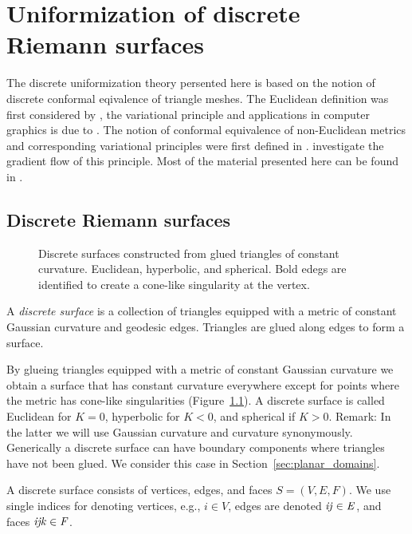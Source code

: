 \chapter{Uniformization of discrete Riemann surfaces}

The discrete uniformization theory persented here is based on the notion of discrete conformal eqivalence of triangle meshes. The Euclidean definition was first considered by \cite{Luo2004}, the variational principle and applications in computer graphics is due to \cite{Springborn2008, OWF2009, Bobenko2010}. The notion of conformal equivalence of non-Euclidean metrics and corresponding variational principles were first defined in \cite{Bobenko2010}. \cite{Guo2011} investigate the gradient flow of this principle.
Most of the material presented here can be found in \cite{BobSechSpr}.

\section{Discrete Riemann surfaces}

\begin{figure}
\centering
\scalebox{0.8}{}
\caption[Discrete surfaces from glued triangles]{Discrete surfaces constructed from glued triangles of constant curvature. Euclidean, hyperbolic, and spherical. Bold edegs are identified to create a cone-like singularity at the vertex.}
\label{fig:surface_triangles}
\end{figure}

\begin{definition}
A \emph{discrete surface} is a collection of triangles equipped with a metric of constant Gaussian curvature and geodesic edges. Triangles are glued along edges to form a surface.
\end{definition}

By glueing triangles equipped with a metric of constant Gaussian curvature we obtain a surface that has constant curvature everywhere except for points where the metric has cone-like singularities (Figure~\ref{fig:surface_triangles}). A discrete surface is called Euclidean for $K=0$, hyperbolic for $K<0$, and spherical if $K>0$.
Remark: In the latter we will use Gaussian curvature and curvature synonymously.
Generically a discrete surface can have boundary components where triangles have not been glued. We consider this case in Section~\ref{sec:planar_domains}. 

A discrete surface consists of vertices, edges, and faces $S=(V, E, F)$. We use single indices for denoting vertices, e.g., $i \in V$, edges are denoted $\it{ij}\in E$, and faces $\it{ijk}\in F$.

